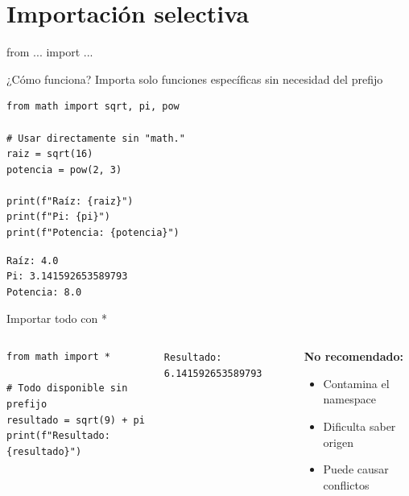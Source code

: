 \documentclass{beamer}
\begin{document}
\section{Importación selectiva}

\begin{frame}[fragile]{from ... import ... \faFilter}
\begin{conceptbox}{¿Cómo funciona?}
Importa solo funciones específicas sin necesidad del prefijo
\end{conceptbox}

\begin{lstlisting}
from math import sqrt, pi, pow

# Usar directamente sin "math."
raiz = sqrt(16)
potencia = pow(2, 3)

print(f"Raíz: {raiz}")
print(f"Pi: {pi}")
print(f"Potencia: {potencia}")
\end{lstlisting}

\vspace{-0.2cm}
\begin{tcolorbox}[colback=green!10,colframe=green,title={\small\faArrowCircleRight \ Salida},coltitle=fg0,left=3pt,right=3pt,top=2pt,bottom=2pt,boxsep=1pt]
\small\texttt{Raíz: 4.0\\
Pi: 3.141592653589793\\
Potencia: 8.0}
\end{tcolorbox}
\end{frame}

\begin{frame}[fragile]{Importar todo con * \faAsterisk}
\begin{columns}[T]
\begin{lstlisting}
from math import *

# Todo disponible sin prefijo
resultado = sqrt(9) + pi
print(f"Resultado: {resultado}")
\end{lstlisting}

\vspace{-0.2cm}
\begin{tcolorbox}[colback=green!10,colframe=green,title={\small\faArrowCircleRight \ Salida},coltitle=fg0,left=3pt,right=3pt,top=2pt,bottom=2pt,boxsep=1pt]
\small\texttt{Resultado: 6.141592653589793}
\end{tcolorbox}

\begin{tcolorbox}[colback=red!10,colframe=red,title={\small\faExclamationTriangle \ Advertencia},coltitle=fg0,left=2pt,right=2pt,top=2pt,bottom=2pt]
\tiny\textbf{No recomendado:}
\begin{itemize}
    \item Contamina el namespace
    \item Dificulta saber origen
    \item Puede causar conflictos
\end{itemize}
\end{tcolorbox}
\end{columns}
\end{frame}
\end{document}
